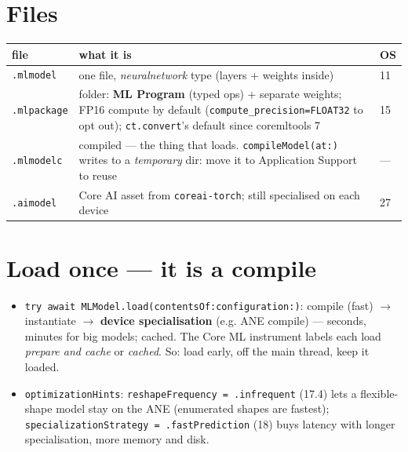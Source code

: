 \documentclass[8pt]{extarticle}
\newcommand\ct[1]{\texttt{#1}}
\begin{document}
\begin{multicols}{2}
\raggedright
\footnotesize{}

\section{Files}
{\scriptsize\setlength{\tabcolsep}{2.5pt}
\begin{tabular}{@{}L{12mm}L{56mm}L{8mm}@{}}
\toprule
\textbf{file} & \textbf{what it is} & \textbf{OS}\\
\midrule
\ct{.mlmodel} & one file, \emph{neuralnetwork} type (layers + weights inside) & 11\\
\ct{.mlpackage} & folder: \textbf{ML Program} (typed ops) + separate weights; FP16 compute by
default (\ct{compute\_precision=FLOAT32} to opt out); \ct{ct.convert}'s default since coremltools 7 & 15\\
\ct{.mlmodelc} & compiled — the thing that loads. \ct{compileModel(at:)} writes to a
\emph{temporary} dir: move it to Application Support to reuse & —\\
\ct{.aimodel} & Core AI asset from \ct{coreai-torch}; still specialised on each device & 27\\
\bottomrule
\end{tabular}}

\section{Load once — it is a compile}
\begin{itemize}
  \item \ct{try await MLModel.load(contentsOf:configuration:)}: compile (fast) $\to$ instantiate
        $\to$ \textbf{device specialisation} (e.g. ANE compile) — seconds, minutes for big
        models; cached. The Core ML instrument labels each load \emph{prepare and cache} or
        \emph{cached}. So: load early, off the main thread, keep it loaded.
  \item \ct{optimizationHints}: \ct{reshapeFrequency = .infrequent} (17.4) lets a
        flexible-shape model stay on the ANE (enumerated shapes are fastest);
        \ct{specializationStrategy = .fastPrediction} (18) buys latency with longer
        specialisation, more memory and disk.
\end{itemize}


\end{multicols}
\end{document}
